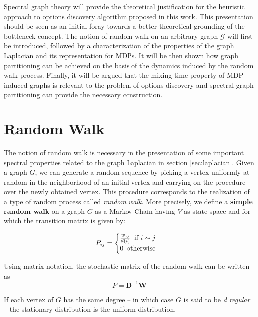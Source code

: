 \documentclass[12pt, oneside, extrafontsizes]{memoir}  %
\theoremstyle{plain}
\theoremstyle{definition}
\begin{document}
Spectral graph theory will provide the theoretical justification for the heuristic approach
to options discovery algorithm proposed in this work. This presentation should be seen
as an initial foray towards a better theoretical grounding of the bottleneck concept. The notion of random walk on an arbitrary graph
$\mathcal{G}$ will first be introduced, followed by a characterization of the properties of the graph Laplacian and its representation for MDPs. It will be then shown how
graph partitioning can be achieved on the basis of the dynamics induced by the random
walk process. Finally, it will be argued that the mixing time property of MDP-induced
graphs is relevant to the problem of options discovery and spectral graph partitioning
can provide the necessary construction. 

\section{Random Walk}
\label{sec:random-walk}
The notion of random walk is necessary in the presentation of some important spectral
properties related to the graph Laplacian in section \ref{sec:laplacian}. Given a graph
$G$, we can generate a random sequence by picking a vertex uniformly at
random in the neighborhood of an initial vertex and carrying on the procedure over the
newly obtained vertex. This procedure corresponds to the realization of a type of
random process called \textit{random walk}. More precisely, we define a \textbf{simple
random walk} on a graph $G$ as a Markov Chain having $V$ as state-space and for
which the transition matrix is given by:

\begin{equation}
P_{ij} = \begin{cases} 
\frac{w_{ij}}{d(i)} \hspace{2mm} \mbox{if $i \sim j$} \\
0 \hspace{2mm} \mbox{otherwise}
\end{cases}
\end{equation}

Using matrix notation, the stochastic matrix of the random walk can be written as
\begin{equation}
P = \mathbf{D}^{-1}\mathbf{W}
\label{eq:random-walk}
\end{equation}

If each vertex of $G$ has the same degree -- in which case $G$ is said to be \textit{d
regular} -- the stationary distribution is the uniform distribution. 
\end{document}
